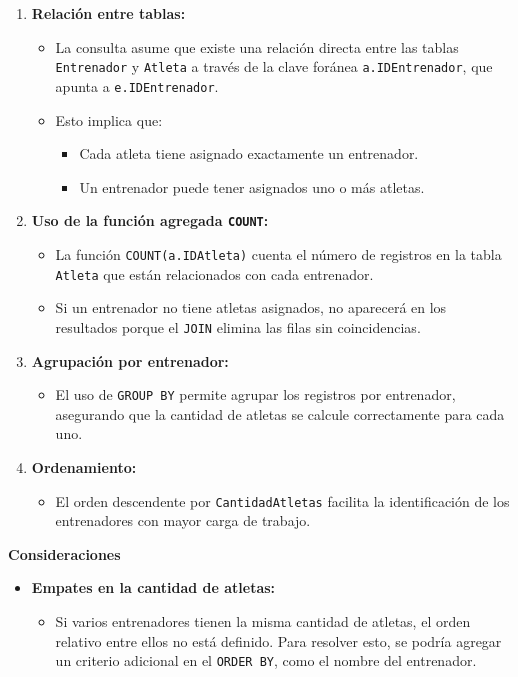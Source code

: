 \begin{enumerate}
   \item \textbf{Relación entre tablas:}
   \begin{itemize}
       \item La consulta asume que existe una relación directa entre las tablas \texttt{Entrenador} y \texttt{Atleta} a través de la clave foránea \texttt{a.IDEntrenador}, que apunta a \texttt{e.IDEntrenador}.
       \item Esto implica que:
       \begin{itemize}
           \item Cada atleta tiene asignado exactamente un entrenador.
           \item Un entrenador puede tener asignados uno o más atletas.
       \end{itemize}
   \end{itemize}
   
   \item \textbf{Uso de la función agregada \texttt{COUNT}:}
   \begin{itemize}
       \item La función \texttt{COUNT(a.IDAtleta)} cuenta el número de registros en la tabla \texttt{Atleta} que están relacionados con cada entrenador.
       \item Si un entrenador no tiene atletas asignados, no aparecerá en los resultados porque el \texttt{JOIN} elimina las filas sin coincidencias.
   \end{itemize}
   
   \item \textbf{Agrupación por entrenador:}
   \begin{itemize}
       \item El uso de \texttt{GROUP BY} permite agrupar los registros por entrenador, asegurando que la cantidad de atletas se calcule correctamente para cada uno.
   \end{itemize}
   
   \item \textbf{Ordenamiento:}
   \begin{itemize}
       \item El orden descendente por \texttt{CantidadAtletas} facilita la identificación de los entrenadores con mayor carga de trabajo.
   \end{itemize}
\end{enumerate}

\textbf{Consideraciones}

\begin{itemize}
   
   \item \textbf{Empates en la cantidad de atletas:}
   \begin{itemize}
       \item Si varios entrenadores tienen la misma cantidad de atletas, el orden relativo entre ellos no está definido. Para resolver esto, se podría agregar un criterio adicional en el \texttt{ORDER BY}, como el nombre del entrenador.
   \end{itemize}
\end{itemize}
